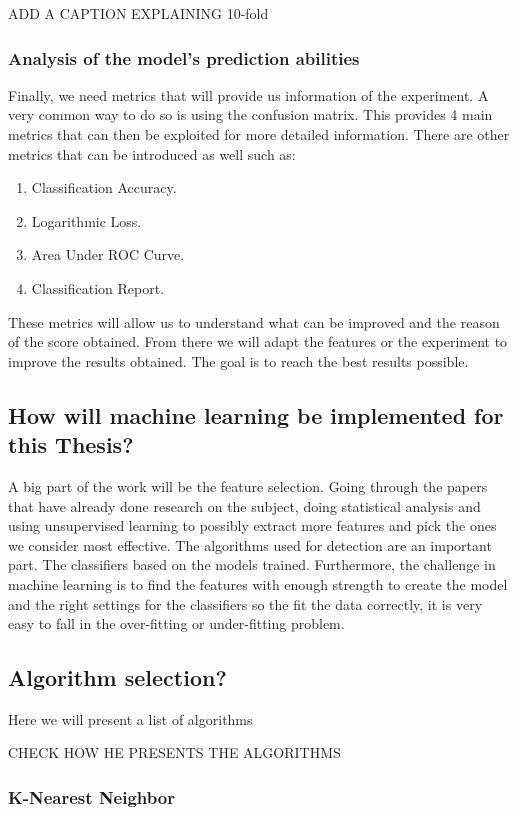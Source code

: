 ADD A CAPTION EXPLAINING 10-fold

\subsubsection{Analysis of the model's prediction abilities}
Finally, we need metrics that will provide us information of the experiment. A very common way to do so is using the confusion matrix. This provides 4 main metrics that can then be exploited for more detailed information. There are other metrics \cite{ml-metrics} that can be introduced as well such as: 
\begin{enumerate}
\item Classification Accuracy.
\item Logarithmic Loss.
\item Area Under ROC Curve.
\item Classification Report.
\end{enumerate}
These metrics will allow us to understand what can be improved and the reason of the score obtained. From there we will adapt the features or the experiment to improve the results obtained. The goal is to reach the best results possible.

\subsection{How will machine learning be implemented for this Thesis?}
A big part of the work will be the feature selection. Going through the papers that have already done research on the subject, doing statistical analysis and using unsupervised learning to possibly extract more features and pick the ones we consider most effective. The algorithms used for detection are an important part. The classifiers based on the models trained. Furthermore, the challenge in machine learning is to find the features with enough strength to create the model and the right settings for the classifiers so the fit the data correctly, it is very easy to fall in the over-fitting or under-fitting problem.

\subsection{Algorithm selection?}
Here we will present a list of algorithms

CHECK HOW HE PRESENTS THE ALGORITHMS

\subsubsection{K-Nearest Neighbor}
